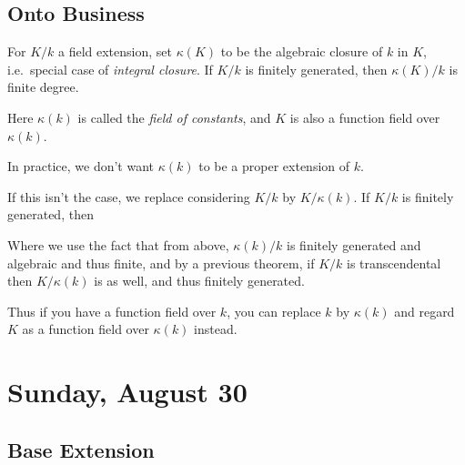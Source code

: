 
\hypertarget{onto-business}{%
\subsection{Onto Business}\label{onto-business}}

\begin{definition}[?]

For \(K/k\) a field extension, set \(\kappa(K)\) to be the algebraic
closure of \(k\) in \(K\), i.e.~special case of \emph{integral closure}.
If \(K/k\) is finitely generated, then \(\kappa(K)/k\) is finite degree.

Here \(\kappa(k)\) is called the \emph{field of constants}, and \(K\) is
also a function field over \(\kappa(k)\).

\end{definition}

In practice, we don't want \(\kappa(k)\) to be a proper extension of
\(k\).

If this isn't the case, we replace considering \(K/k\) by
\(K/\kappa(k)\). If \(K/k\) is finitely generated, then

\begin{center}
\end{center}

Where we use the fact that from above, \(\kappa(k)/k\) is finitely
generated and algebraic and thus finite, and by a previous theorem, if
\(K/k\) is transcendental then \(K/\kappa(k)\) is as well, and thus
finitely generated.

Thus if you have a function field over \(k\), you can replace \(k\) by
\(\kappa(k)\) and regard \(K\) as a function field over \(\kappa(k)\)
instead.

\hypertarget{sunday-august-30}{%
\section{Sunday, August 30}\label{sunday-august-30}}

\hypertarget{base-extension}{%
\subsection{Base Extension}\label{base-extension}}

